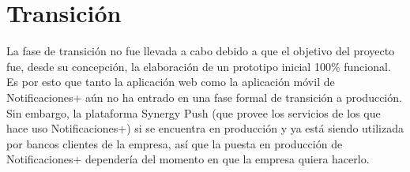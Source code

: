 





\section{Transición} \label{sect:Transicion}
La fase de transición no fue llevada a cabo debido a que el objetivo del proyecto fue, desde su concepción, la elaboración de un prototipo inicial 100\% funcional. Es por esto que tanto la aplicación web como la aplicación móvil de Notificaciones+ aún no ha entrado en una fase formal de transición a producción. Sin embargo, la plataforma Synergy Push (que provee los servicios de los que hace uso Notificaciones+) si se encuentra en producción y ya está siendo utilizada por bancos clientes de la empresa, así que la puesta en producción de Notificaciones+ dependería del momento en que la empresa quiera hacerlo.

